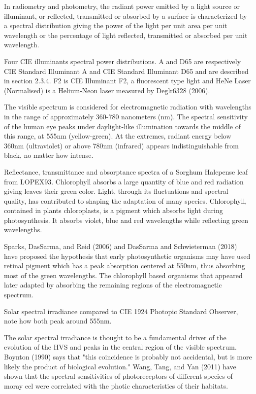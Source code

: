 In radiometry and photometry, the radiant power emitted by a light source or illuminant, or reflected, transmitted or absorbed by a surface is characterized by a spectral distribution giving the power of the light per unit area per unit wavelength or the percentage of light reflected, transmitted or absorbed per unit wavelength.


Four CIE illuminants spectral power distributions. A and D65 are respectively CIE Standard Illuminant A and CIE Standard Illuminant D65 and are described in section 2.3.4. F2 is CIE Illuminant F2, a fluorescent type light and HeNe Laser (Normalised) is a Helium-Neon laser measured by Deglr6328 (2006).

The visible spectrum is considered for electromagnetic radiation with wavelengths in the range of approximately 360-780 nanometers (nm). The spectral sensitivity of the human eye peaks under daylight-like illumination towards the middle of this range, at 555nm (yellow-green). At the extremes, radiant energy below 360nm (ultraviolet)  or above 780nm (infrared) appears indistinguishable from black, no matter how intense.


Reflectance, transmittance and absorptance spectra of a Sorghum Halepense leaf from LOPEX93. Chlorophyll absorbs a large quantity of blue and red radiation giving leaves their green color.
Light, through its fluctuations and spectral quality, has contributed to shaping the adaptation of many species. Chlorophyll, contained in plants chloroplasts, is a pigment which absorbs light during photosynthesis. It absorbs violet, blue and red wavelengths while reflecting green wavelengths. 

Sparks, DasSarma, and Reid (2006) and DasSarma and Schwieterman (2018) have proposed the hypothesis that early photosynthetic organisms may have used retinal pigment which has a peak absorption centered at 550nm, thus absorbing most of the green wavelengths. The chlorophyll based organisms that appeared later adapted by absorbing the remaining regions of the electromagnetic spectrum.



Solar spectral irradiance compared to CIE 1924 Photopic Standard Observer, note how both peak around 555nm.

The solar spectral irradiance is thought to be a fundamental driver of the evolution of the HVS and peaks in the central region of the visible spectrum. Boynton (1990) says that "this coincidence is probably not accidental, but is more likely the product of biological evolution." Wang, Tang, and Yan (2011) have shown that the spectral sensitivities of photoreceptors of different species of moray eel were correlated with the photic characteristics of their habitats.

